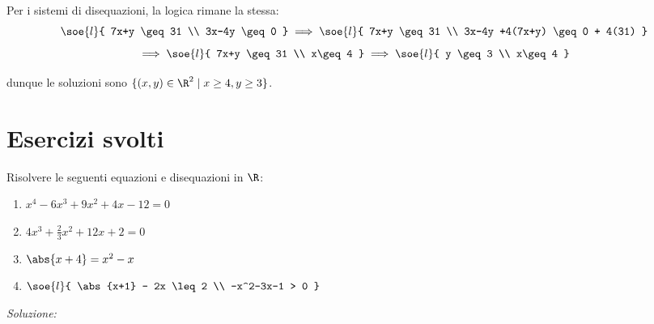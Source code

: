 \documentclass[a4paper, 12pt]{report}
\begin{document}
    Per i sistemi di disequazioni, la logica rimane la stessa:
    \[\soe{l}{
        7x+y \geq 31 \\
        3x-4y \geq 0
    } \implies
    \soe{l}{
        7x+y \geq 31 \\
        3x-4y +4(7x+y) \geq 0 + 4(31)
    } \]
    \[\implies
    \soe{l}{
        7x+y \geq 31 \\
        x\geq 4
    } \implies
    \soe{l}{
        y \geq 3 \\
        x\geq 4
    }\]

    dunque le soluzioni sono $\{(x,y) \in \R^2 \mid x \geq 4, y \geq 3\}$.


    \newpage

    \section{Esercizi svolti}

    \begin{framedprob}{}
        Risolvere le seguenti equazioni e disequazioni in $\R$:
        \begin{enumerate}
            \item $x^4-6x^3+9x^2+4x-12 = 0$
            \item $4 x^3 + \frac{2}{3}x^2 + 12 x + 2 = 0$
            \item $\abs{x+4} = x^2-x$
            \item $\soe{l}{
                \abs{x+1} - 2x \leq 2 \\
                -x^2-3x-1 > 0
            }$
        \end{enumerate}
    \end{framedprob}

    \textit{Soluzione:}
\end{document}
